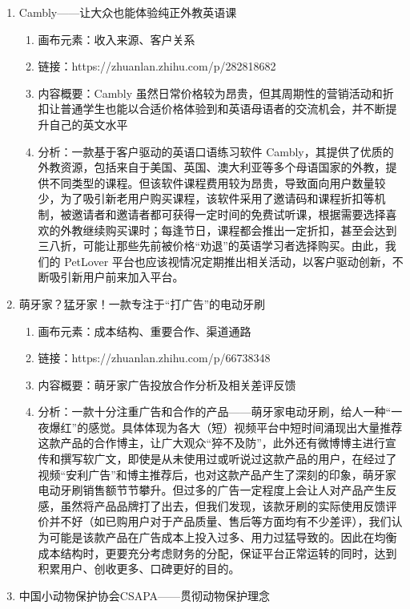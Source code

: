 \documentclass[a4paper]{ctexart}
\begin{document}
\begin{enumerate}[label=\alph*.]
\begin{enumerate}[label=\alph*.]
  \end{enumerate}
  \item Cambly——让大众也能体验纯正外教英语课
  \begin{enumerate}[label=\alph*.]
    \item 画布元素：收入来源、客户关系
    \item 链接：https://zhuanlan.zhihu.com/p/282818682
    \item 内容概要：Cambly 虽然日常价格较为昂贵，但其周期性的营销活动和折扣让普通学生也能以合适价格体验到和英语母语者的交流机会，并不断提升自己的英文水平
    \item 分析：一款基于客户驱动的英语口语练习软件 Cambly，其提供了优质的外教资源，包括来自于美国、英国、澳大利亚等多个母语国家的外教，提供不同类型的课程。但该软件课程费用较为昂贵，导致面向用户数量较少，为了吸引新老用户购买课程，该软件采用了邀请码和课程折扣等机制，被邀请者和邀请者都可获得一定时间的免费试听课，根据需要选择喜欢的外教继续购买课时；每逢节日，课程都会推出一定折扣，甚至会达到三八折，可能让那些先前被价格“劝退”的英语学习者选择购买。由此，我们的 PetLover 平台也应该视情况定期推出相关活动，以客户驱动创新，不断吸引新用户前来加入平台。
  \end{enumerate}
  \item 萌牙家？猛牙家！一款专注于“打广告”的电动牙刷
  \begin{enumerate}[label=\alph*.]
    \item 画布元素：成本结构、重要合作、渠道通路
    \item 链接：https://zhuanlan.zhihu.com/p/66738348
    \item 内容概要：萌牙家广告投放合作分析及相关差评反馈
    \item 分析：一款十分注重广告和合作的产品——萌牙家电动牙刷，给人一种“一夜爆红”的感觉。具体体现为各大（短）视频平台中短时间涌现出大量推荐这款产品的合作博主，让广大观众“猝不及防”，此外还有微博博主进行宣传和撰写软广文，即使是从未使用过或听说过这款产品的用户，在经过了视频“安利广告”和博主推荐后，也对这款产品产生了深刻的印象，萌牙家电动牙刷销售额节节攀升。但过多的广告一定程度上会让人对产品产生反感，虽然将产品品牌打了出去，但我们发现，该款牙刷的实际使用反馈评价并不好（如已购用户对于产品质量、售后等方面均有不少差评），我们认为可能是该款产品在广告成本上投入过多、用力过猛导致的。因此在均衡成本结构时，更要充分考虑财务的分配，保证平台正常运转的同时，达到积累用户、创收更多、口碑更好的目的。
  \end{enumerate}
  \item 中国小动物保护协会CSAPA——贯彻动物保护理念
  \begin{enumerate}[label=\alph*.]

\end{enumerate}
\end{enumerate}
\end{document}
